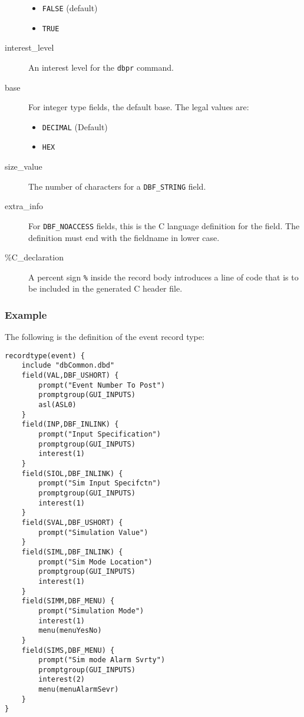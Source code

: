 \begin{description}
\begin{itemize}
\item \verb|FALSE| (default)
\item \verb|TRUE|
\end{itemize}

\item [interest\_level] An interest level for the \verb|dbpr| command.

\item [base] For integer type fields, the default base.
The legal values are:

\begin{itemize}
\item \verb|DECIMAL| (Default)
\item \verb|HEX|
\end{itemize}

\item [size\_value] The number of characters for a \verb|DBF_STRING| field.

\item [extra\_info] For \verb|DBF_NOACCESS| fields, this is the C language definition for the field.
The definition must end with the fieldname in lower case.

\item [\%C\_declaration] A percent sign \verb|%| inside the record body introduces a line of code that is to be included in the generated C header file.
\end{description}

\subsubsection{Example}

The following is the definition of the event record type:

\begin{lstlisting}[language=dbd]
recordtype(event) {
    include "dbCommon.dbd" 
    field(VAL,DBF_USHORT) {
        prompt("Event Number To Post")
        promptgroup(GUI_INPUTS)
        asl(ASL0)
    }
    field(INP,DBF_INLINK) {
        prompt("Input Specification")
        promptgroup(GUI_INPUTS)
        interest(1)
    }
    field(SIOL,DBF_INLINK) {
        prompt("Sim Input Specifctn")
        promptgroup(GUI_INPUTS)
        interest(1)
    }
    field(SVAL,DBF_USHORT) {
        prompt("Simulation Value")
    }
    field(SIML,DBF_INLINK) {
        prompt("Sim Mode Location")
        promptgroup(GUI_INPUTS)
        interest(1)
    }
    field(SIMM,DBF_MENU) {
        prompt("Simulation Mode")
        interest(1)
        menu(menuYesNo)
    }
    field(SIMS,DBF_MENU) {
        prompt("Sim mode Alarm Svrty")
        promptgroup(GUI_INPUTS)
        interest(2)
        menu(menuAlarmSevr)
    }
}
\end{lstlisting}

